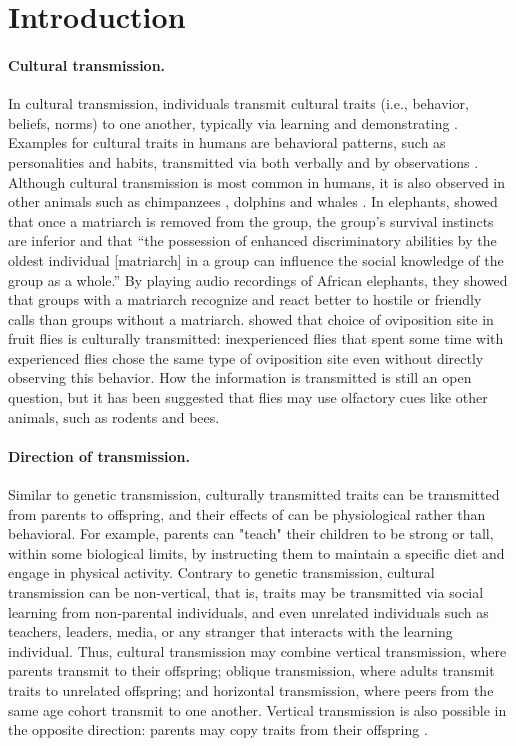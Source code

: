 \documentclass[12pt]{extarticle}
\begin{document}
\section*{Introduction}

\paragraph{Cultural transmission.}
In cultural transmission, individuals transmit cultural traits (i.e., behavior, beliefs, norms) to one another, typically via learning and demonstrating \citep{transmissionVectorsBook}.
Examples for cultural traits in humans are behavioral patterns, such as personalities and habits, transmitted via both verbally and by observations \citep{cultural_traits}. 
Although cultural transmission is most common in humans, it is also observed in other animals such as chimpanzees \citep{chimpsPrestige, chimpsCopy}, dolphins and whales \citep{dolphins_whales}.
In elephants, \citet{elepahntsRepo} showed that once a matriarch is removed from the group, the group's survival instincts are inferior and that ``the possession of enhanced discriminatory abilities by the oldest individual [matriarch] in a group can influence the social knowledge of the group as a whole.''
By playing audio recordings of African elephants, they showed that groups with a matriarch recognize and react better to hostile or friendly calls than groups without a matriarch.
\citet{fliesPaper} showed that choice of oviposition site in fruit flies is culturally transmitted: inexperienced flies that spent some time with experienced flies chose the same type of oviposition site even without directly observing this behavior. How the information is transmitted is still an open question, but it has been suggested that flies may use olfactory cues like other animals, such as rodents and bees.

\paragraph{Direction of transmission.}
Similar to genetic transmission, culturally transmitted traits can be transmitted from parents to offspring, and their effects of can be physiological rather than behavioral.
For example, parents can "teach" their children to be strong or tall, within some biological limits, by instructing them to maintain a specific diet and engage in physical activity.
Contrary to genetic transmission, cultural transmission can be non-vertical, that is, traits may be transmitted via social learning from non-parental individuals, and even unrelated individuals such as teachers, leaders, media, or any stranger that interacts with the learning individual.
Thus, cultural transmission may combine vertical transmission, where parents transmit to their offspring; oblique transmission, where adults transmit traits to unrelated offspring; and horizontal transmission, where peers from the same age cohort transmit to one another. 
Vertical transmission is also possible in the opposite direction: parents may copy traits from their offspring \citep{transmissionVectorsBook,transmissionVectors}.
\end{document}

